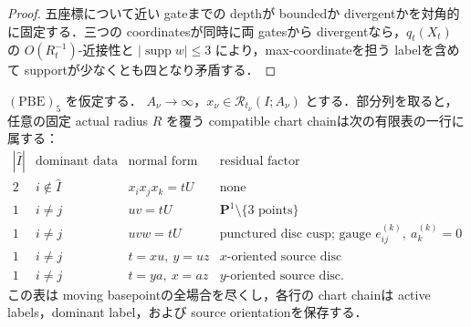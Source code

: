 \documentclass[a4paper,11pt]{ltjsarticle}
\numberwithin{equation}{section}
\theoremstyle{plain}
\theoremstyle{definition}
\theoremstyle{remark}
\newcommand{\PP}{\mathbf P}\newcommand{\CC}{\mathbf C}\newcommand{\RR}{\mathbf R}\newcommand{\ZZ}{\mathbf Z}\newcommand{\NN}{\mathbf N}
\newcommand{\supp}{\operatorname{supp}}\newcommand{\diam}{\operatorname{diam}}\newcommand{\dist}{\operatorname{dist}}
\begin{document}
\begin{proof}
五座標について近い gateまでの depthが boundedか divergentかを対角的に固定する．三つの coordinatesが同時に両 gatesから divergentなら，$q_t(X_t)$ の $O(R_t^{-1})$-近接性と $|\supp w|\le3$ により，max-coordinateを担う labelを含めて supportが少なくとも四となり矛盾する．
\end{proof}

\begin{proposition}\label{sharp:prop:flag-star-model-cover}
$\mathrm{(PBE)}_5$ を仮定する．
$A_\nu\to\infty$，$x_\nu\in\mathcal R_{t_\nu}(I;A_\nu)$ とする．部分列を取ると，任意の固定 actual radius $R$ を覆う compatible chart chainは次の有限表の一行に属する：
\[
\begin{array}{c|c|c|c}
|\widehat I|&\text{dominant data}&\text{normal form}&\text{residual factor}\\ \hline
2&i\notin\widehat I&x_ix_jx_k=tU&\text{none}\\
1&i\ne j&uv=tU&\PP^1\setminus\{3\text{ points}\}\\
1&i\ne j&uvw=tU&\text{punctured disc cusp; gauge }e^{(k)}_{ij},\ a_k^{(k)}=0\\
1&i\ne j&t=xu,\ y=uz&x\text{-oriented source disc}\\
1&i\ne j&t=ya,\ x=az&y\text{-oriented source disc}.
\end{array}
\]
この表は moving basepointの全場合を尽くし，各行の chart chainは active labels，dominant label，および source orientationを保存する．
\end{proposition}
\end{document}
